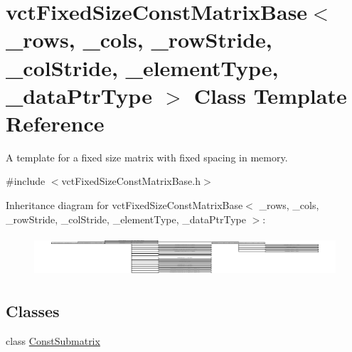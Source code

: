 \hypertarget{classvct_fixed_size_const_matrix_base}{\section{vct\-Fixed\-Size\-Const\-Matrix\-Base$<$ \-\_\-rows, \-\_\-cols, \-\_\-row\-Stride, \-\_\-col\-Stride, \-\_\-element\-Type, \-\_\-data\-Ptr\-Type $>$ Class Template Reference}
\label{classvct_fixed_size_const_matrix_base}
}


A template for a fixed size matrix with fixed spacing in memory.  




{\ttfamily \#include $<$vct\-Fixed\-Size\-Const\-Matrix\-Base.\-h$>$}

Inheritance diagram for vct\-Fixed\-Size\-Const\-Matrix\-Base$<$ \-\_\-rows, \-\_\-cols, \-\_\-row\-Stride, \-\_\-col\-Stride, \-\_\-element\-Type, \-\_\-data\-Ptr\-Type $>$\-:\begin{figure}[H]
\begin{center}
\leavevmode
\includegraphics[height=1.514793cm]{d1/d55/classvct_fixed_size_const_matrix_base}
\end{center}
\end{figure}
\subsection*{Classes}
\begin{DoxyCompactItemize}
\item 
class \hyperlink{classvct_fixed_size_const_matrix_base_1_1_const_submatrix}{Const\-Submatrix}
\end{DoxyCompactItemize}
